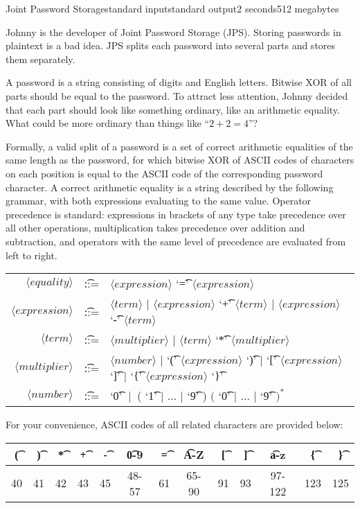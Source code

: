 \begin{problem}{Joint Password Storage}{standard input}{standard output}{2 seconds}{512 megabytes}

Johnny is the developer of Joint Password Storage (JPS). Storing passwords in plaintext is a bad idea. JPS splits each password into several parts and stores them separately.

A password is a string consisting of digits and English letters. Bitwise XOR of all parts should be equal to the password. To attract less attention, Johnny decided that each part should look like something ordinary, like an arithmetic equality. What could be more ordinary than things like ``$2+2=4$''? 

Formally, a valid split of a password is a set of correct arithmetic equalities of the same length as the password, for which bitwise XOR of ASCII codes of characters on each position is equal to the ASCII code of the corresponding password character. A correct arithmetic equality is a string described by the following grammar, with both expressions evaluating to the same value. Operator precedence is standard: expressions in brackets of any type take precedence over all other operations, multiplication takes precedence over addition and subtraction, and operators with the same level of precedence are evaluated from left to right.

\begin{tabular}{rcl}
$\langle equality \rangle$ &\t{::=}& $\langle expression \rangle$ `\t{=}' $\langle expression \rangle$ \\
$\langle expression \rangle$ &\t{::=}& $\langle term \rangle$ | $\langle expression \rangle$ `\t{+}' $\langle term \rangle$ | $\langle expression \rangle$ `\t{-}' $\langle term \rangle$  \\
$\langle term \rangle$ &\t{::=}& $\langle multiplier \rangle$ | $\langle term \rangle$ `\t{*}' $\langle multiplier \rangle$ \\
$\langle multiplier \rangle$ &\t{::=}& $\langle number \rangle$ | `\t{(}' $\langle expression\rangle$ `\t{)}' |  `\t{[}' $\langle expression\rangle$ `\t{]}' | `\t{\{}' $\langle expression \rangle$ `\t{\}}' \\
$\langle number \rangle$ &\t{::=}& `\t{0}' $\ \vert\ $ ( `\t{1}' | ... | `\t{9}' ) $($ `\t{0}' | ... | `\t{9}' $)^*$
\end{tabular}


For your convenience, ASCII codes of all related characters are provided below:
\vspace{-2mm}
\begin{center}
\begin{tabular} {|c|c|c|c|c|c|c|c|c|c|c|c|c|}
\hline
\t{(}  & \t{)}  & \t{*}  & \t{+}  & \t{-}  &  \t{0-9}    &  \t{=}  & \t{A-Z}   & \t{[} & \t{]}   & \t{a-z}    &\t{\{}  & \t{\}} \\ \hline
40 & 41 & 42 & 43 & 45 &  48-57  &  61 & 65-90 & 91 & 93 & 97-122 &123 & 125 \\ \hline
\end{tabular}
\end{center}
\vspace{-2mm}



\end{problem}
